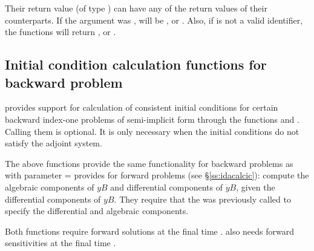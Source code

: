 Their return value  (of type ) can have any of the return values of their counterparts.
If the  argument was , 
 will be ,  or
. 
Also, if  is not a valid identifier, the functions will return 
,  or .


\subsection{Initial condition calculation functions for backward problem}
\label{sss:idacalcicB}

{\idas} provides support for calculation of consistent initial 
conditions for certain backward index-one problems of semi-implicit form through
the functions  and . Calling them is 
optional. It is only necessary when the initial conditions do not satisfy
the adjoint system. 

The above functions provide the same functionality for backward problems as 
 with parameter  =   
provides for forward problems (see \S\ref{ss:idacalcic}): compute the 
algebraic components of $yB$ and differential  components of $\dot{y}B$, given 
the differential components of $yB$.  They require that the 
was previously called to specify the differential and algebraic components.


Both functions require forward solutions at the final time .
 also needs forward sensitivities at the final time .

